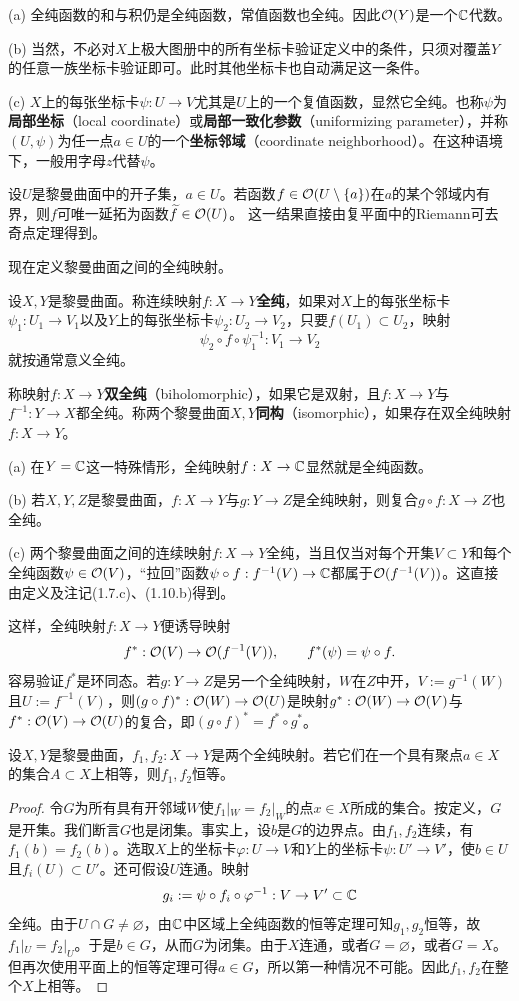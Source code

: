 (a) 全纯函数的和与积仍是全纯函数，常值函数也全纯。因此$\mathcal O(Y)$是一个$\mathbb C$代数。

(b) 当然，不必对$X$上极大图册中的所有坐标卡验证定义中的条件，只须对覆盖$Y$的任意一族坐标卡验证即可。此时其他坐标卡也自动满足这一条件。

(c) $X$上的每张坐标卡$\psi:U\to V$尤其是$U$上的一个复值函数，显然它全纯。也称$\psi$为\textbf{局部坐标}（local coordinate）或\textbf{局部一致化参数}（uniformizing parameter），并称$(U,\psi)$为任一点$a\in U$的一个\textbf{坐标邻域}（coordinate neighborhood）。在这种语境下，一般用字母$z$代替$\psi$。

设$U$是黎曼曲面中的开子集，$a\in U$。若函数$f\in\mathcal O(U\setminus\{a\})$在$a$的某个邻域内有界，则$f$可唯一延拓为函数$\widetilde f\in\mathcal O(U)$。
这一结果直接由复平面中的Riemann可去奇点定理得到。

现在定义黎曼曲面之间的全纯映射。

设$X,Y$是黎曼曲面。称连续映射$f:X\to Y$\textbf{全纯}，如果对$X$上的每张坐标卡$\psi_1:U_1\to V_1$以及$Y$上的每张坐标卡$\psi_2:U_2\to V_2$，只要$f(U_1)\subset U_2$，映射
\[
\psi_2\circ f\circ\psi_1^{-1}:V_1\to V_2
\]
就按通常意义全纯。

称映射$f:X\to Y$\textbf{双全纯}（biholomorphic），如果它是双射，且$f:X\to Y$与$f^{-1}:Y\to X$都全纯。称两个黎曼曲面$X,Y$\textbf{同构}（isomorphic），如果存在双全纯映射$f:X\to Y$。

(a) 在$Y=\mathbb C$这一特殊情形，全纯映射$f:X\to\mathbb C$显然就是全纯函数。

(b) 若$X,Y,Z$是黎曼曲面，$f:X\to Y$与$g:Y\to Z$是全纯映射，则复合$g\circ f:X\to Z$也全纯。

(c) 两个黎曼曲面之间的连续映射$f:X\to Y$全纯，当且仅当对每个开集$V\subset Y$和每个全纯函数$\psi\in\mathcal O(V)$，“拉回”函数$\psi\circ f:f^{-1}(V)\to\mathbb C$都属于$\mathcal O(f^{-1}(V))$。这直接由定义及注记(1.7.c)、(1.10.b)得到。

这样，全纯映射$f:X\to Y$便诱导映射
\[
f^*:\mathcal O(V)\to\mathcal O(f^{-1}(V)),\qquad f^*(\psi)=\psi\circ f.
\]
容易验证$f^*$是环同态。若$g:Y\to Z$是另一个全纯映射，$W$在$Z$中开，$V:=g^{-1}(W)$且$U:=f^{-1}(V)$，则$(g\circ f)^*:\mathcal O(W)\to\mathcal O(U)$是映射$g^*:\mathcal O(W)\to\mathcal O(V)$与$f^*:\mathcal O(V)\to\mathcal O(U)$的复合，即$(g\circ f)^*=f^*\circ g^*$。

设$X,Y$是黎曼曲面，$f_1,f_2:X\to Y$是两个全纯映射。若它们在一个具有聚点$a\in X$的集合$A\subset X$上相等，则$f_1,f_2$恒等。

\begin{proof}
令$G$为所有具有开邻域$W$使$f_1|_W=f_2|_W$的点$x\in X$所成的集合。按定义，$G$是开集。我们断言$G$也是闭集。事实上，设$b$是$G$的边界点。由$f_1,f_2$连续，有$f_1(b)=f_2(b)$。选取$X$上的坐标卡$\varphi:U\to V$和$Y$上的坐标卡$\psi:U'\to V'$，使$b\in U$且$f_i(U)\subset U'$。还可假设$U$连通。映射
\[
g_i:=\psi\circ f_i\circ\varphi^{-1}:V\to V'\subset\mathbb C
\]
全纯。由于$U\cap G\ne\varnothing$，由$\mathbb C$中区域上全纯函数的恒等定理可知$g_1,g_2$恒等，故$f_1|_U=f_2|_U$。于是$b\in G$，从而$G$为闭集。由于$X$连通，或者$G=\varnothing$，或者$G=X$。但再次使用平面上的恒等定理可得$a\in G$，所以第一种情况不可能。因此$f_1,f_2$在整个$X$上相等。
\end{proof}

